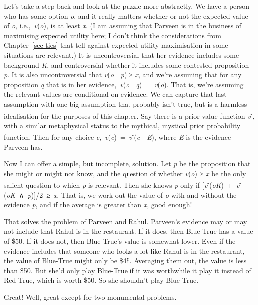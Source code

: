 \documentclass[
  12pt,
  letterpaper,
]{scrbook}
\begin{document}
Let's take a step back and look at the puzzle more abstractly. We have a
person who has some option \emph{o}, and it really matters whether or
not the expected value of \emph{o}, i.e.,~\emph{v}(\emph{o}), is at
least \emph{x}. (I am assuming that Parveen is in the business of
maximising expected utility here; I don't think the considerations from
Chapter~\ref{sec-ties} that tell against expected utility maximisation
in some situations are relevant.) It is uncontroversial that her
evidence includes some background \emph{K}, and controversial whether it
includes some contested proposition \emph{p}. It is also uncontroversial
that \emph{v}(\emph{o}~\textbar~\emph{p}) ≥ \emph{x}, and we're assuming
that for any proposition \emph{q} that is in her
evidence,~\emph{v}(\emph{o}~\textbar~\emph{q})~=~\emph{v}(\emph{o}).
That is, we're assuming the relevant values are conditional on evidence.
We can capture that last assumption with one big assumption that
probably isn't true, but is a harmless idealisation for the purposes of
this chapter. Say there is a prior value function
\emph{v}\textsuperscript{-}, with a similar metaphysical status to the
mythical, mystical prior probability function. Then for any choice
\emph{c},~\emph{v}(\emph{c})~=~\emph{v}\textsuperscript{-}(\emph{c}~\textbar~\emph{E}),
where \emph{E} is the evidence Parveen has.

Now I can offer a simple, but incomplete, solution. Let \emph{p} be the
proposition that she might or might not know, and the question of
whether \emph{v}(\emph{o}) ≥ \emph{x} be the only salient question to
which \emph{p} is relevant. Then she knows \emph{p} only if
{[}\emph{v}\textsuperscript{-}(\emph{o}\textbar{}\emph{K})~+~\emph{v}\textsuperscript{-}(\emph{o}\textbar{}\emph{K}~∧~\emph{p}){]}/2~≥~\emph{x}.
That is, we work out the value of \emph{o} with and without the evidence
\emph{p}, and if the average is greater than \emph{x}, good enough!

That solves the problem of Parveen and Rahul. Parveen's evidence may or
may not include that Rahul is in the restaurant. If it does, then
Blue-True has a value of \$50. If it does not, then Blue-True's value is
somewhat lower. Even if the evidence includes that someone who looks a
lot like Rahul is in the restaurant, the value of Blue-True might only
be \$45. Averaging them out, the value is less than \$50. But she'd only
play Blue-True if it was worthwhile it play it instead of Red-True,
which is worth \$50. So she shouldn't play Blue-True.

Great! Well, great except for two monumental problems.
\end{document}
